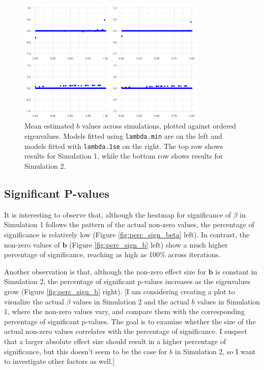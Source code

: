 \documentclass[12pt]{article}
\begin{document}
\begin{figure}[h!]
	\centering
	\includegraphics[width=0.8\textwidth]{b_estimates.png}
	\caption{Mean estimated \( b \) values across simulations, plotted against ordered eigenvalues. Models fitted using
		\texttt{lambda.min} are on the left and models fitted with \texttt{lambda.1se} on the right. The top row shows results for Simulation 1, while the bottom row shows results for Simulation 2.}
	\label{fig:b_estimates}
\end{figure}

\FloatBarrier

\subsection*{Significant P-values}

It is interesting to observe that, although the heatmap for significance of \( \beta \) in Simulation 1 follows the pattern of the actual non-zero values, the percentage of significance is relatively low (Figure \ref{fig:perc_sign_beta} left). In contrast, the non-zero values of \( \mathbf{b} \) (Figure \ref{fig:perc_sign_b} left) show a much higher percentage of significance, reaching as high as 100\% across iterations.

Another observation is that, although the non-zero effect size for \( \mathbf{b} \) is constant in Simulation 2, the percentage of significant p-values increases as the eigenvalues grow (Figure \ref{fig:perc_sign_b} right). [I am considering creating a plot to visualize the actual \( \beta \) values in Simulation 2 and the actual \( b \) values in Simulation 1, where the non-zero values vary, and compare them with the corresponding percentage of significant p-values. The goal is to examine whether the size of the actual non-zero values correlates with the percentage of significance. I suspect that a larger absolute effect size should result in a higher percentage of significance, but this doesn’t seem to be the case for \( b \) in Simulation 2, so I want to investigate other factors as well.]
\end{document}
